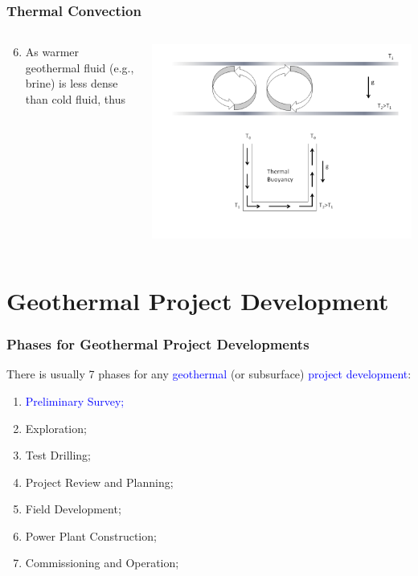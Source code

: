 \documentclass[10pt,compress]{beamer}
\newcommand{\blue}{\textcolor{blue}}
\begin{document}
\begin{frame}
 \frametitle{Thermal Convection}
  \begin{columns}
   \begin{column}[c]{0.45\linewidth}
    \begin{enumerate}[1.]\setcounter{enumi}{5} \scriptsize
       \item <1-> As warmer geothermal fluid (e.g., brine) is less dense than cold fluid, thus 
    \end{enumerate}
   \end{column}
   \begin{column}[c]{0.55\linewidth}
     \begin{center}
        \includegraphics[width=5.cm,clip]{./Pics/GeothermalConvection.png}
     \end{center}
   \end{column}  
  \end{columns}
\end{frame}



















 \section{Geothermal Project Development} %

\begin{frame}
 \frametitle{Phases for Geothermal Project Developments} 
    There is usually 7 phases for any \blue{geothermal} (or subsurface) \blue{project development}: 
    \begin{enumerate}[1.]
       \item <1-> \blue{Preliminary Survey;}
       \item <1-> Exploration; 
       \item <1-> Test Drilling;
       \item <1-> Project Review and Planning;
       \item <1-> Field Development; 
       \item <1-> Power Plant Construction;
       \item <1-> Commissioning and Operation;
    \end{enumerate}
\end{frame}
\end{document}

